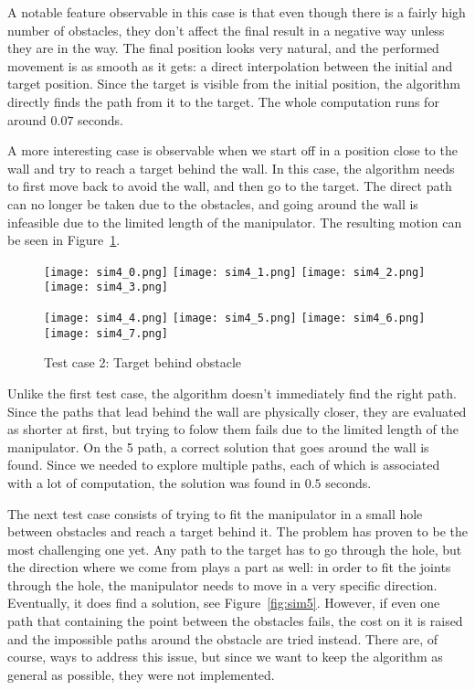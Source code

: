 A notable feature observable in this case is that even though there is a fairly high number of obstacles, they don't affect the final result in a negative way unless they are in the way. The final position looks very natural, and the performed movement is as smooth as it gets: a direct interpolation between the initial and target position. Since the target is visible from the initial position, the algorithm directly finds the path from it to the target. The whole computation runs for around $0.07$ seconds.

A more interesting case is observable when we start off in a position close to the wall and try to reach a target behind the wall. In this case, the algorithm needs to first move back to avoid the wall, and then go to the target. The direct path can no longer be taken due to the obstacles, and going around the wall is infeasible due to the limited length of the manipulator. The resulting motion can be seen in Figure~\ref{fig:sim4}.

\begin{figure}[h]
  \centering
  \begin{minipage}{\textwidth}
    \texttt{[image: sim4\_0.png]}
    \texttt{[image: sim4\_1.png]}
    \texttt{[image: sim4\_2.png]}
    \texttt{[image: sim4\_3.png]}

    \texttt{[image: sim4\_4.png]}
    \texttt{[image: sim4\_5.png]}
    \texttt{[image: sim4\_6.png]}
    \texttt{[image: sim4\_7.png]}
  \end{minipage}
  \caption{Test case 2: Target behind obstacle}\label{fig:sim4}
\end{figure}

Unlike the first test case, the algorithm doesn't immediately find the right path. Since the paths that lead behind the wall are physically closer, they are evaluated as shorter at first, but trying to folow them fails due to the limited length of the manipulator. On the 5\th{} path, a correct solution that goes around the wall is found. Since we needed to explore multiple paths, each of which is associated with a lot of computation, the solution was found in $0.5$ seconds.

The next test case consists of trying to fit the manipulator in a small hole between obstacles and reach a target behind it. The problem has proven to be the most challenging one yet. Any path to the target has to go through the hole, but the direction where we come from plays a part as well: in order to fit the joints through the hole, the manipulator needs to move in a very specific direction. Eventually, it does find a solution, see Figure~\ref{fig:sim5}. However, if even one path that containing the point between the obstacles fails, the cost on it is raised and the impossible paths around the obstacle are tried instead. There are, of course, ways to address this issue, but since we want to keep the algorithm as general as possible, they were not implemented.

